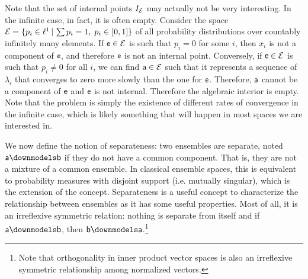 Note that the set of internal points $I_{\Ens}$ may actually not be very interesting. In the infinite case, in fact, it is often empty. Consider the space $\Ens = \{ p_i \in \ell^1 \, | \,  \sum p_ i =1, \; p_i \in [0,1]\}$ of all probability distributions over countably infinitely many elements. If $\ens \in \Ens$ is such that $p_i=0$ for some $i$, then $x_i$ is not a component of $\ens$, and therefore $\ens$ is not an internal point. Conversely, if $\ens \in \Ens$ is such that $p_i \neq 0$ for all $i$, we can find $\ens[a] \in \Ens$ such that it represents a sequence of $\lambda_i$ that converges to zero more slowly than the one for $\ens$. Therefore, $\ens[a]$ cannot be a component of $\ens$ and $\ens$ is not internal. Therefore the algebraic interior is empty. Note that the problem is simply the existence of different rates of convergence in the infinite case, which is likely something that will happen in most spaces we are interested in.

We now define the notion of separateness: two ensembles are separate, noted $\ens[a] \separate \ens[b]$ if they do not have a common component. That is, they are not a mixture of a common ensemble. In classical ensemble spaces, this is equivalent to probability measures with disjoint support (i.e. mutually singular), which is the extension of the concept. Separateness is a useful concept to characterize the relationship between ensembles as it has some useful properties. Most of all, it is an irreflexive symmetric relation: nothing is separate from itself and if $\ens[a] \separate \ens[b]$, then $\ens[b] \separate \ens[a]$.\footnote{Note that orthogonality in inner product vector spaces is also an irreflexive symmetric relationship among normalized vectors.}

